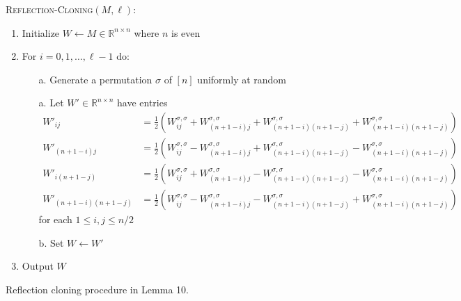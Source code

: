 \documentclass[11pt]{article}
\begin{document}
\begin{figure}[t!]
\begin{algbox}
\textsc{Reflection-Cloning}$(M, \ell)$:
\begin{enumerate}
\item Initialize $W \gets M \in \mathbb{R}^{n \times n}$ where $n$ is even
\item For $i = 0, 1, \dots, \ell - 1$ do:
\begin{enumerate}
\item[a.] Generate a permutation $\sigma$ of $[n]$ uniformly at random
\item[a.] Let $W' \in \mathbb{R}^{n \times n}$ have entries
\begin{align*}
W'_{ij} &= \frac{1}{2} \left( W_{ij}^{\sigma, \sigma} + W_{(n+1-i)j}^{\sigma, \sigma} + W_{(n+1-i)(n+1-j)}^{\sigma, \sigma} + W_{(n+1-i)(n+1-j)}^{\sigma, \sigma} \right) \\
W'_{(n+1-i)j} &= \frac{1}{2} \left( W_{ij}^{\sigma, \sigma} - W_{(n+1-i)j}^{\sigma, \sigma} + W_{(n+1-i)(n+1-j)}^{\sigma, \sigma} - W_{(n+1-i)(n+1-j)}^{\sigma, \sigma} \right) \\
W'_{i(n+1-j)} &= \frac{1}{2} \left( W_{ij}^{\sigma, \sigma} + W_{(n+1-i)j}^{\sigma, \sigma} - W_{(n+1-i)(n+1-j)}^{\sigma, \sigma} - W_{(n+1-i)(n+1-j)}^{\sigma, \sigma} \right) \\
W'_{(n+1-i)(n+1-j)} &= \frac{1}{2} \left( W_{ij}^{\sigma, \sigma} - W_{(n+1-i)j}^{\sigma, \sigma} - W_{(n+1-i)(n+1-j)}^{\sigma, \sigma} + W_{(n+1-i)(n+1-j)}^{\sigma, \sigma} \right)
\end{align*}
for each $1 \le i, j \le n/2$
\item[b.] Set $W \gets W'$
\end{enumerate}
\item Output $W$
\end{enumerate}
\vspace{1mm}
\end{algbox}
\caption{Reflection cloning procedure in Lemma 10.}
\end{figure}
\end{document}
